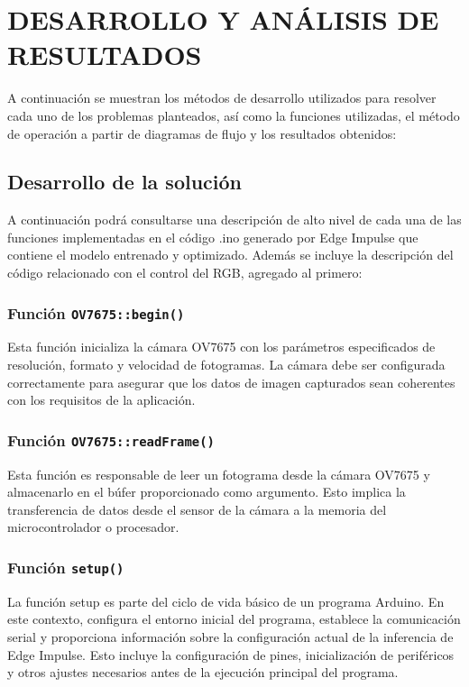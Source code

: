 \newpage
\section{DESARROLLO Y ANÁLISIS DE RESULTADOS}

A continuación se muestran los métodos de desarrollo utilizados para resolver cada uno de los problemas planteados, así como la funciones utilizadas, el método de operación a partir de diagramas de flujo y los resultados obtenidos:

\subsection{Desarrollo de la solución}

A continuación podrá consultarse una descripción de alto nivel de cada una de las funciones implementadas en el código .ino generado por Edge Impulse que contiene el modelo entrenado y optimizado. Además se incluye la descripción del código relacionado con el control del RGB, agregado al primero:

\subsubsection{Función \texttt{OV7675::begin()}}
Esta función inicializa la cámara OV7675 con los parámetros especificados de resolución, formato y velocidad de fotogramas. La cámara debe ser configurada correctamente para asegurar que los datos de imagen capturados sean coherentes con los requisitos de la aplicación.

\subsubsection{Función \texttt{OV7675::readFrame()}}
Esta función es responsable de leer un fotograma desde la cámara OV7675 y almacenarlo en el búfer proporcionado como argumento. Esto implica la transferencia de datos desde el sensor de la cámara a la memoria del microcontrolador o procesador.

\subsubsection{Función \texttt{setup()}}
La función setup es parte del ciclo de vida básico de un programa Arduino. En este contexto, configura el entorno inicial del programa, establece la comunicación serial y proporciona información sobre la configuración actual de la inferencia de Edge Impulse. Esto incluye la configuración de pines, inicialización de periféricos y otros ajustes necesarios antes de la ejecución principal del programa.

